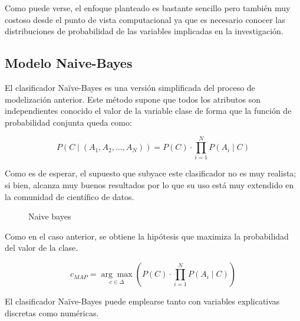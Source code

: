 \documentclass[
  a4paper,
  DIV=11,
  numbers=noendperiod]{scrreprt}
\begin{document}
Como puede verse, el enfoque planteado es bastante sencillo pero también
muy costoso desde el punto de vista computacional ya que es necesario
conocer las distribuciones de probabilidad de las variables implicadas
en la investigación.

\subsection{Modelo Naive-Bayes}\label{modelo-naive-bayes}

El clasificador Naïve-Bayes es una versión simplificada del proceso de
modelización anterior. Este método supone que todos los atributos son
independientes conocido el valor de la variable clase de forma que la
función de probabilidad conjunta queda como:

\[P(C \mid (A_1, A_2, \ldots, A_N)) = P(C) \cdot \prod_{i=1}^{N} P(A_i \mid C)\]

Como es de esperar, el supuesto que subyace este clasificador no es muy
realista; si bien, alcanza muy buenos resultados por lo que su uso está
muy extendido en la comunidad de científico de datos.

\begin{figure}


\caption{\label{fig-naivebayes}Naive bayes}

\end{figure}%

Como en el caso anterior, se obtiene la hipótesis que maximiza la
probabilidad del valor de la clase.

\[c_{MAP} = \underset{c \in \Delta}{\arg\max} \left( P(C) \cdot \prod_{i=1}^{N} P(A_i \mid C) \right)\]

El clasificador Naïve-Bayes puede emplearse tanto con variables
explicativas discretas como numéricas.
\end{document}
